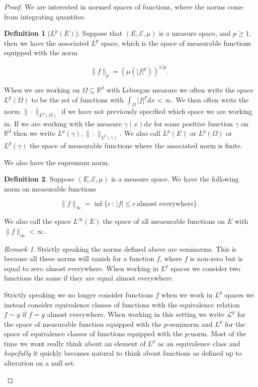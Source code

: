 \documentclass[
]{book}
\theoremstyle{definition}
\newtheorem{definition}{Definition}[chapter]
\theoremstyle{definition}
\theoremstyle{definition}
\theoremstyle{definition}
\theoremstyle{remark}
\newtheorem*{remark}{Remark}
\begin{document}
\begin{proof}
We are interested in normed spaces of functions, where the norms come from integrating quantites.

\begin{definition}[$L^p(E)$]
Suppose that \((E, \mathcal{E}, \mu)\) is a measure space, and \(p \geq 1\), then we have the associated \(L^p\) space, which is the space of measurable functions equipped with the norm

\[\| f\|_p = \left( \mu(|f|^p)\right)^{1/p}. \]

When we are working on \(\Omega \subseteq \mathbb{R}^d\) with Lebesgue measure we often write the space \(L^p(\Omega)\) to be the set of functions with \(\int_\Omega |f|^p \mathrm{d}x < \infty\). We then often write the norm \(\| \cdot\|_{L^p(\Omega)}\) if we have not previously specified which space we are working in. If we are working with the measure \(\gamma(x) \mathrm{d}x\) for some positive function \(\gamma\) on \(\mathbb{R}^d\) then we write \(L^p(\gamma), \| \cdot\|_{L^p(\gamma)}\). We also call \(L^p(E)\) or \(L^p(\Omega)\) or \(L^p(\gamma)\) the space of measurable functions where the associated norm is finite.
\end{definition}

We also have the supremum norm.

\begin{definition}
Suppose \((E, \mathcal{E}, \mu)\) is a measure space. We have the following norm on measurable functions

\[ \|f\|_\infty = \inf \{ c \,:\, |f| \leq c \, \mbox{almost everywhere}\}. \]

We also call the space \(L^\infty(E)\) the space of all measurable functions on \(E\) with \(\|f\|_\infty < \infty\).
\end{definition}

\begin{remark}
Strictly speaking the norms defined above are seminorms. This is because all these norms will vanish for a function \(f\), where \(f\) is non-zero but is equal to zero almost everywhere. When working in \(L^p\) spaces we consider two functions the same if they are equal almost everywhere.

Strictly speaking we no longer consider functions \(f\) when we work in \(L^p\) spaces we instead consider equivalence classes of functions with the equivalence relation \(f \sim g\) if \(f=g\) almost everywhere. When working in this setting we write \(\mathcal{L}^p\) for the space of measurable function equipped with the \(p\)-seminorm and \(L^p\) for the space of equivalence classes of functions equipped with the \(p\)-norm. Most of the time we wont really think about an element of \(L^p\) as an equivalence class and \emph{hopefully} it quickly becomes natural to think about functions as defined up to alteration on a null set.
\end{remark}


\end{proof}
\end{document}
